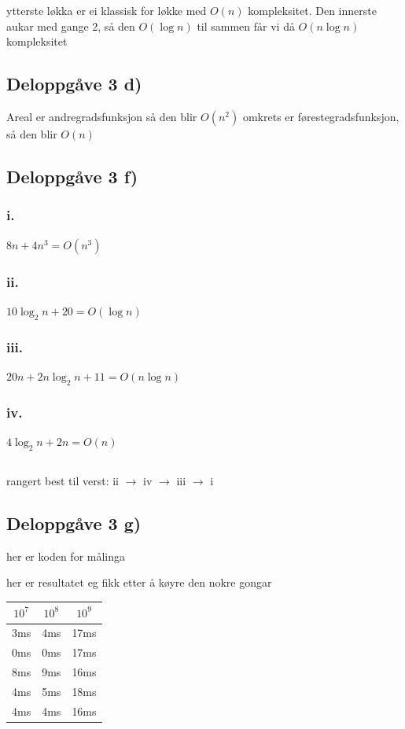 \documentclass{article}
\begin{document}
ytterste løkka er ei klassisk for løkke med $O(n)$ kompleksitet.
Den innerste aukar med gange 2, så den $O(\log n)$ 
til sammen får vi då $O(n \log n)$ kompleksitet

\subsection{Deloppgåve 3 d)}
Areal er andregradsfunksjon så den blir $O(n^2)$
omkrets er førestegradsfunksjon, så den blir $O(n)$

\subsection{Deloppgåve 3 f)}

\subsubsection*{i.}
$8n + 4n^3 = O(n^3)$
\subsubsection*{ii.}
$10 \log_2 n + 20 = O(\log n)$
\subsubsection*{iii.}
$20n + 2n \log_2 n + 11 = O(n \log n)$
\subsubsection*{iv.}
$4 \log_2 n + 2n = O(n)$

\subsection*{}

rangert best til verst:
ii $\rightarrow$ iv $\rightarrow$ iii $\rightarrow$ i


\subsection{Deloppgåve 3 g)}
her er koden for målinga


her er resultatet eg fikk etter å køyre den nokre gongar

\begin{center}
\begin{tabular}{ |c|c|c| } 
    \hline
    $10^7$ & $10^8$ & $10^9$  \\ 
    \hline
    3ms & 4ms & 17ms \\ 
    0ms & 0ms & 17ms \\ 
    8ms & 9ms & 16ms \\ 
    4ms & 5ms & 18ms \\
    4ms & 4ms & 16ms \\
    \hline
\end{tabular}
\end{center}
\end{document}
